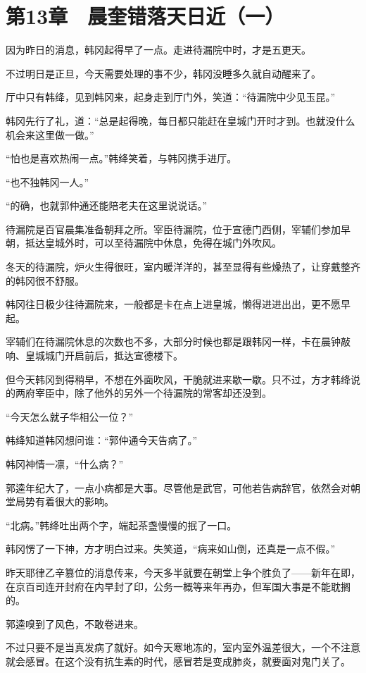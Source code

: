 \section{第13章　晨奎错落天日近（一）}

因为昨日的消息，韩冈起得早了一点。走进待漏院中时，才是五更天。

不过明日是正旦，今天需要处理的事不少，韩冈没睡多久就自动醒来了。

厅中只有韩绛，见到韩冈来，起身走到厅门外，笑道：“待漏院中少见玉昆。”

韩冈先行了礼，道：“总是起得晚，每日都只能赶在皇城门开时才到。也就没什么机会来这里做一做。”

“怕也是喜欢热闹一点。”韩绛笑着，与韩冈携手进厅。

“也不独韩冈一人。”

“的确，也就郭仲通还能陪老夫在这里说说话。”

待漏院是百官晨集准备朝拜之所。宰臣待漏院，位于宣德门西侧，宰辅们参加早朝，抵达皇城外时，可以至待漏院中休息，免得在城门外吹风。

冬天的待漏院，炉火生得很旺，室内暖洋洋的，甚至显得有些燥热了，让穿戴整齐的韩冈很不舒服。

韩冈往日极少往待漏院来，一般都是卡在点上进皇城，懒得进进出出，更不愿早起。

宰辅们在待漏院休息的次数也不多，大部分时候也都是跟韩冈一样，卡在晨钟敲响、皇城城门开启前后，抵达宣德楼下。

但今天韩冈到得稍早，不想在外面吹风，干脆就进来歇一歇。只不过，方才韩绛说的两府宰臣中，除了他外的另外一个待漏院的常客却还没到。

“今天怎么就子华相公一位？”

韩绛知道韩冈想问谁：“郭仲通今天告病了。”

韩冈神情一凛，“什么病？”

郭逵年纪大了，一点小病都是大事。尽管他是武官，可他若告病辞官，依然会对朝堂局势有着很大的影响。

“北病。”韩绛吐出两个字，端起茶盏慢慢的抿了一口。

韩冈愣了一下神，方才明白过来。失笑道，“病来如山倒，还真是一点不假。”

昨天耶律乙辛篡位的消息传来，今天多半就要在朝堂上争个胜负了——新年在即，在京百司连开封府在内早封了印，公务一概等来年再办，但军国大事是不能耽搁的。

郭逵嗅到了风色，不敢卷进来。

不过只要不是当真发病了就好。如今天寒地冻的，室内室外温差很大，一个不注意就会感冒。在这个没有抗生素的时代，感冒若是变成肺炎，就要面对鬼门关了。

